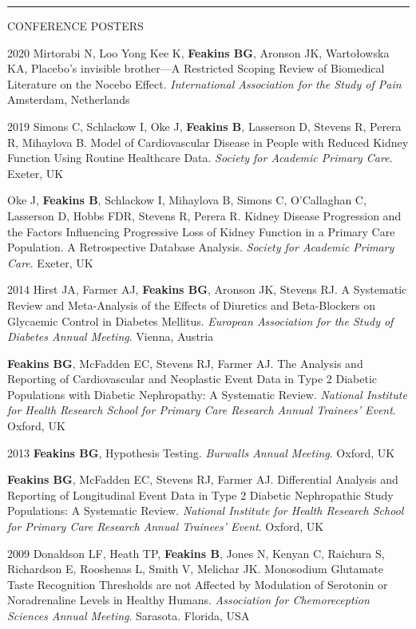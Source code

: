 \documentclass[10pt,a4paper]{article}
\begin{document}
\noindent\rule{\textwidth}{0.4pt}
\begin{cvlist}{CONFERENCE POSTERS}
	
	\item[2020]
	Mirtorabi N, Loo Yong Kee K, \textbf{Feakins BG}, Aronson JK, Warto\l{}owska KA, Placebo's invisible brother---A Restricted Scoping Review of Biomedical Literature on the Nocebo Effect. \textit{International Association for the Study of Pain} Amsterdam, Netherlands
	
	\item[2019]
	Simons C, Schlackow I, Oke J, \textbf{Feakins B}, Lasserson D, Stevens R, Perera R, Mihaylova B. Model of Cardiovascular Disease in People with Reduced Kidney Function Using Routine Healthcare Data. \textit{Society for Academic Primary Care}. Exeter, UK
	
	\item[]
	Oke J, \textbf{Feakins B}, Schlackow I, Mihaylova B, Simons C, O’Callaghan C, Lasserson D, Hobbs FDR, Stevens R, Perera R. Kidney Disease Progression and the Factors Influencing Progressive Loss of Kidney Function in a Primary Care Population. A Retrospective Database Analysis. \textit{Society for Academic Primary Care}. Exeter, UK
	
	\item[2014]
	Hirst JA, Farmer AJ, \textbf{Feakins BG}, Aronson JK, Stevens RJ. A Systematic Review and Meta-Analysis of the Effects of Diuretics and Beta-Blockers on Glycaemic Control in Diabetes Mellitus. \textit{European Association for the Study of Diabetes Annual Meeting}. Vienna, Austria
	
	\item[]
	\textbf{Feakins BG}, McFadden EC, Stevens RJ, Farmer AJ. The Analysis and Reporting of Cardiovascular and Neoplastic Event Data in Type 2 Diabetic Populations with Diabetic Nephropathy: A Systematic Review. \textit{National Institute for Health Research School for Primary Care Research Annual Trainees' Event}. Oxford, UK
	
	\item[2013]
	\textbf{Feakins BG}, Hypothesis Testing. \textit{Burwalls Annual Meeting}. Oxford, UK
	
	\item[]
	\textbf{Feakins BG}, McFadden EC, Stevens RJ, Farmer AJ. Differential Analysis and Reporting of Longitudinal Event Data in Type 2 Diabetic Nephropathic Study Populations: A Systematic Review. \textit{National Institute for Health Research School for Primary Care Research Annual Trainees' Event}. Oxford, UK
	
	\item[2009]
	Donaldson LF, Heath TP, \textbf{Feakins B}, Jones N, Kenyan C, Raichura S, Richardson E, Rooshenas L, Smith V, Melichar JK. Monosodium Glutamate Taste Recognition Thresholds are not Affected by Modulation of Serotonin or Noradrenaline Levels in Healthy Humans. \textit{Association for Chemoreception Sciences Annual Meeting}. Sarasota. Florida, USA
	
\end{cvlist}
\end{document}
